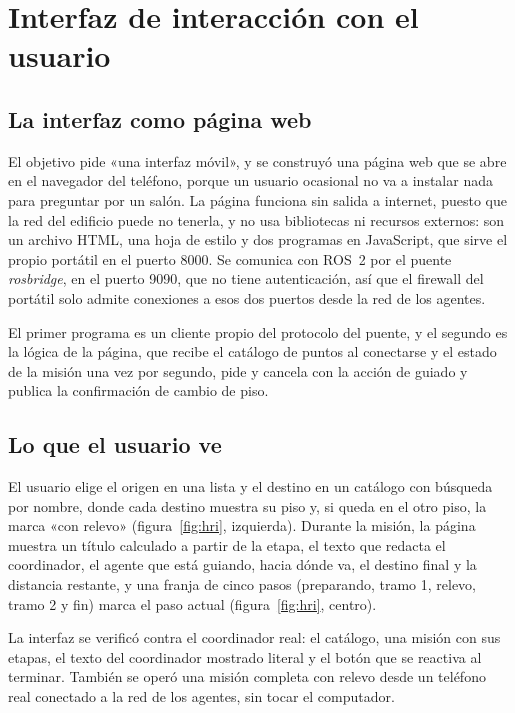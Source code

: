 \section{Interfaz de interacción con el usuario}
\label{sec:oe3}

\subsection{La interfaz como página web}

El objetivo pide «una interfaz móvil», y se construyó una página web que se abre en el navegador del teléfono, porque un usuario ocasional no va a instalar nada para preguntar por un salón. La página funciona sin
salida a internet, puesto que la red del edificio puede no tenerla, y no usa bibliotecas ni recursos externos: son un archivo HTML, una hoja de estilo y dos programas en JavaScript, que sirve el propio portátil en el puerto 8000.
Se comunica con ROS~2 por el puente \textit{rosbridge}, en el puerto 9090, que no tiene autenticación, así que el firewall del portátil solo admite conexiones a esos dos puertos desde la red de los agentes.

El primer programa es un cliente propio del protocolo del puente, y el segundo es la lógica de la página, que recibe el catálogo de puntos al conectarse y el estado de la misión una vez por segundo, pide y cancela
con la acción de guiado y publica la confirmación de cambio de piso.

\subsection{Lo que el usuario ve}

El usuario elige el origen en una lista y el destino en un catálogo con búsqueda por nombre, donde cada destino muestra su piso y, si queda en el otro piso, la marca «con relevo» (figura~\ref{fig:hri}, izquierda).
Durante la misión, la página muestra un título calculado a partir de la etapa, el texto que redacta el coordinador, el agente que está guiando, hacia dónde va, el destino final y la distancia restante, y una franja de
cinco pasos (preparando, tramo 1, relevo, tramo 2 y fin) marca el paso actual (figura~\ref{fig:hri}, centro).

La interfaz se verificó contra el coordinador real: el catálogo, una misión con sus etapas, el texto del coordinador mostrado literal y el botón que se reactiva al terminar. También se operó una misión completa con
relevo desde un teléfono real conectado a la red de los agentes, sin tocar el computador.

